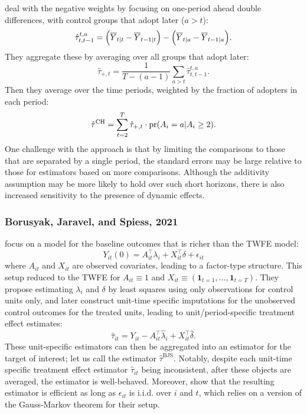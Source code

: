 \documentclass[letterpaper,12pt,leqno]{article}
\newcommand{\pr}{{\rm pr}}
\begin{document}
\citep{de2020two}
deal with the negative weights by focusing on one-period ahead double differences, with control groups that adopt later ($a>t$):
\[\hat\tau_{t,t-1}^{t,a}=\Bigl(\overline{Y}_{t|t}-\overline{Y}_{t-1|t}\Bigr)
-\Bigl(\overline{Y}_{t|a}-\overline{Y}_{t-1|a}\Bigr).\]
They aggregate these by averaging over all groups that adopt later:
\[\hat\tau_{+,t}=\frac{1}{T-(a-1)}\sum_{a>t} \hat\tau_{t,t-1}^{t,a}.\]
Then they average over the time periods, weighted by the fraction of adopters in each period:
\[ \hat\tau^{\textrm{CH}}=\sum_{t=2}^T\hat\tau_{+,t}\cdot\pr(A_i=a|A_i\geq 2).\]
One challenge with the \citep{de2020two} approach is that by limiting the comparisons to those that are separated by a single period, the standard errors may be large relative to those for estimators based on more comparisons. Although the additivity assumption may be more likely to hold over such short horizons, there is also increased sensitivity to the presence of dynamic effects.



\subsubsection{Borusyak, Jaravel, and Spiess, 2021}

 \citep{borusyak2021revisiting} focus on a  model for the baseline outcomes that is richer than the TWFE model:
 \begin{equation*}
     Y_{it}(0) = A_{it}^\top \lambda_i + X_{it}^\top \delta + \epsilon_{it}
 \end{equation*}
 where $A_{it}$ and $X_{it}$ are observed covariates, leading to a factor-type structure. This setup reduced to the TWFE for $A_{it} \equiv 1$ and $X_{it} \equiv \left(\mathbf{1}_{t = 1}, \dots, \mathbf{1}_{t = T}\right)$. They propose estimating $\lambda_i$ and $\delta$ by least squares using only observations for control units only, and later construct unit-time specific imputations for the unobserved control outcomes for the treated units, leading to unit/period-specific treatment effect estimates:
 \begin{equation*}
     \hat \tau_{it} = Y_{it} -  A_{it}^\top \hat\lambda_i + X_{it}^\top \hat\delta.
 \end{equation*}
These unit-specific estimators can then be aggregated into an estimator for the target of interest; let us call the estimator $\hat\tau^\mathrm{BJS}$. Notably, despite each
unit-time specific treatment effect estimator $\hat \tau_{it}$ being inconsistent, after these objects are averaged, the estimator is well-behaved. Moreover,  \citep{borusyak2021revisiting} show that the resulting estimator is efficient as long as $\epsilon_{it}$ is i.i.d. over $i$ and $t$, which relies on a version of the Gauss-Markov theorem for their setup.
\end{document}
